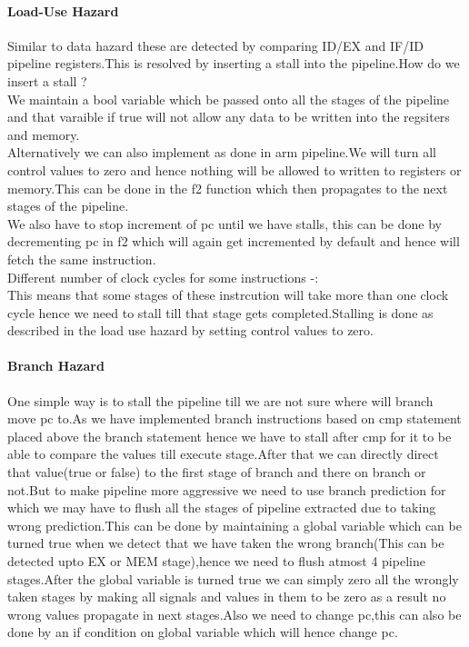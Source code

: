 \documentclass[12pt]{extarticle}
\begin{document}
\paragraph{Load-Use Hazard}
Similar to data hazard these are detected by comparing ID/EX and IF/ID pipeline registers.This is resolved by inserting a stall into the pipeline.How do we insert a stall ?\\
We maintain a bool variable which be passed onto all the stages of the pipeline and that varaible if true will not allow any data to be written into the regsiters and memory.\\
Alternatively we can also implement as done in arm pipeline.We will turn all control values to zero and hence nothing will be allowed to written to registers or memory.This can be done in the f2 function which then propagates to the next stages of the pipeline.\\
															We also have to stop increment of pc until we have stalls, this can be done by decrementing pc in f2 which will again get incremented by default and hence will fetch the same instruction.\\
Different number of clock cycles for some instructions -:\\
This means that some stages of these instrcution will take more than one clock cycle hence we need to stall till that stage gets completed.Stalling is done as described in the load use hazard by setting control values to zero.


\paragraph{Branch Hazard}
 One simple way is to stall the pipeline till we are not sure where will branch move pc to.As we have implemented branch instructions based on cmp statement placed above the branch statement hence we have to stall after cmp for it to be able to compare the values till execute stage.After that we can directly direct that value(true or false) to the first stage of branch and there on branch or not.But to make pipeline more aggressive we need to use branch prediction for which we may have to flush all the stages of pipeline extracted due to taking wrong prediction.This can be done by maintaining a global variable which can be turned true when we detect that we have taken the wrong branch(This can be detected upto EX or MEM stage),hence we need to flush atmost 4 pipeline stages.After the global variable is turned true we can simply zero all the wrongly taken stages by making all signals and values in them to be zero as a result no wrong values propagate in next stages.Also we need to change pc,this can also be done by an if condition on global variable which will hence change pc.
     
\end{document}
